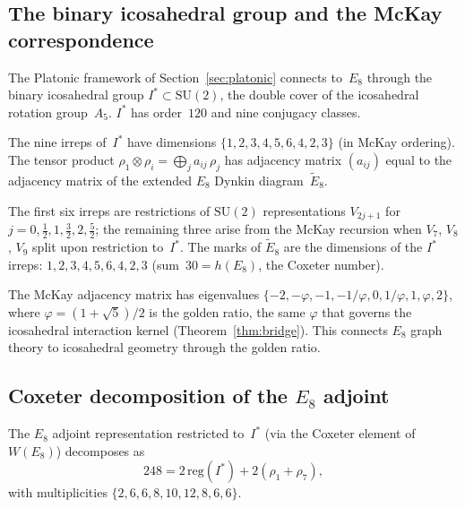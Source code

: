 \subsection{The binary icosahedral group and the McKay correspondence}
\label{sec:i-star-mckay}

The Platonic framework of Section~\ref{sec:platonic} connects to~$E_8$
through the binary icosahedral group $I^* \subset \mathrm{SU}(2)$,
the double cover of the icosahedral rotation group~$A_5$.
$I^*$ has order~$120$ and nine conjugacy classes.

\begin{theorem}\label{thm:mckay-i-star}
The nine irreps of~$I^*$ have dimensions
$\{1, 2, 3, 4, 5, 6, 4, 2, 3\}$ (in McKay ordering).
The tensor product
$\rho_1 \otimes \rho_i = \bigoplus_j a_{ij}\,\rho_j$
has adjacency matrix $(a_{ij})$ equal to the adjacency matrix of the
extended $E_8$ Dynkin diagram~$\tilde{E}_8$.
\end{theorem}

The first six irreps are restrictions of $\mathrm{SU}(2)$ representations
$V_{2j+1}$ for $j = 0, \tfrac{1}{2}, 1, \tfrac{3}{2}, 2, \tfrac{5}{2}$;
the remaining three arise from the McKay recursion when $V_7$, $V_8$,
$V_9$ split upon restriction to~$I^*$.
The marks of $\tilde{E}_8$ are the dimensions of the $I^*$ irreps:
$1, 2, 3, 4, 5, 6, 4, 2, 3$ (sum~$30 = h(E_8)$, the Coxeter number).

The McKay adjacency matrix has eigenvalues
$\{-2, -\varphi, -1, -1/\varphi, 0, 1/\varphi, 1, \varphi, 2\}$,
where $\varphi = (1+\sqrt{5})/2$ is the golden ratio, the same
$\varphi$ that governs the icosahedral interaction kernel
(Theorem~\ref{thm:bridge}).  This connects $E_8$ graph theory to
icosahedral geometry through the golden ratio.

\subsection{Coxeter decomposition of the $E_8$ adjoint}
\label{sec:coxeter-decomposition}

\begin{theorem}\label{thm:coxeter}
The $E_8$ adjoint representation restricted to~$I^*$ (via the
Coxeter element of $W(E_8)$) decomposes as
\begin{equation}\label{eq:coxeter}
  248 = 2\,\mathrm{reg}(I^*) + 2(\rho_1 + \rho_7),
\end{equation}
with multiplicities $\{2, 6, 6, 8, 10, 12, 8, 6, 6\}$.
\end{theorem}

